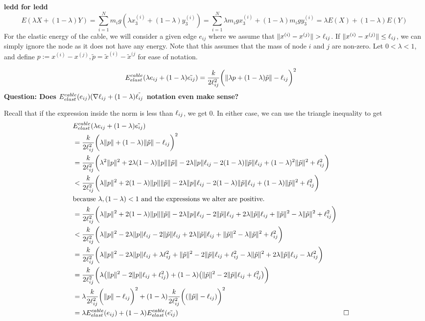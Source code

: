 \textbf{ledd for ledd}
\begin{equation*}
    E(\lambda X +(1-\lambda) Y) = \sum_{i=1}^N m_i g (\lambda x_3^{(i)} + (1-\lambda) y_3^{(i)})
    =\sum_{i=1}^N \lambda m_i g x_3^{(i)} + (1-\lambda) m_i g  y_3^{(i)} = \lambda E(X) + (1-\lambda) E(Y)
\end{equation*}
For the elastic energy of the cable, we will consider a given edge $e_{ij}$ where we assume that $\lVert x^{(i)} - x^{(j)}\rVert > \ell_{ij}$. If $\lVert x^{(i)} - x^{(j)}\rVert \leq \ell_{ij}$, we can simply ignore the node as it does not have any energy. Note that this assumes that the mass of node $i$ and $j$ are non-zero. Let $0 < \lambda < 1$, and define $p:=x^{(i)} - x^{(j)}, \tilde{p} = \tilde{x}^{(i)}-\tilde{x}^{(j}$ for ease of notation.


\begin{align*}
     E^{cable}_{elast}(\lambda e_{ij} + (1-\lambda) \tilde{e_{ij}}) &= \frac{k}{2 \ell_{ij}^2} \bigg( \lVert \lambda p + ( 1-\lambda ) \tilde{p} \rVert -\ell_{ij}\bigg)^2
\end{align*}
\textbf{Question: Does $E^{cable}_{elast}(e_{ij}) (\nabla \ell_{ij} + (1-\lambda) \tilde{\ell_{ij}}$ notation even make sense? }

Recall that if the expression inside the norm is less than $\ell_{ij}$, we get $0$. In either case, we can use the triangle inequality to get
\begin{align*}    
     &E^{cable}_{elast}(\lambda e_{ij} + (1-\lambda) \tilde{e_{ij}})\\ &=
      \frac{k}{2 \ell_{ij}^2} \bigg( \lambda \lVert p \rVert +( 1-\lambda ) \lVert \tilde{p} \rVert -\ell_{ij}\bigg)^2 \\ 
     &=\frac{k}{2 \ell_{ij}^2} \bigg( \lambda^2 \lVert p \rVert^2 + 2 \lambda (1-\lambda) \lVert p \rVert \lVert \tilde{p} \rVert -2 \lambda \lVert p \rVert \ell_{ij} -2(1-\lambda) \lVert \tilde{p} \rVert \ell_{ij} + (1-\lambda)^2 \lVert \tilde{p} \rVert^2 + \ell_{ij}^2 \bigg) \\
     &<\frac{k}{2 \ell_{ij}^2} \bigg( \lambda \lVert p \rVert^2 + 2 (1-\lambda) \lVert p \rVert \lVert \tilde{p} \rVert -2 \lambda \lVert p \rVert \ell_{ij} -2(1-\lambda) \lVert \tilde{p} \rVert \ell_{ij} + (1-\lambda) \lVert \tilde{p} \rVert^2 + \ell_{ij}^2 \bigg) \\ & \text{because }\lambda, (1-\lambda) < 1 \text{ and the expressions we alter are positive.} \\
     &= \frac{k}{2 \ell_{ij}^2} \bigg(\lambda \lVert p \rVert^2 + 2 (1-\lambda) \lVert p \rVert \lVert \tilde{p} \rVert - 2 \lambda \lVert p \rVert \ell_{ij} -2\lVert \tilde{p} \rVert \ell_{ij} +2 \lambda \lVert \tilde{p} \rVert \ell_{ij} + \lVert \tilde{p} \rVert^2 - \lambda \lVert \tilde{p} \rVert^2 + \ell_{ij}^2 \bigg) \\
     &< \frac{k}{2 \ell_{ij}^2} \bigg(\lambda \lVert p \rVert^2 - 2 \lambda \lVert p \rVert \ell_{ij} -2\lVert \tilde{p} \rVert \ell_{ij} +2 \lambda \lVert \tilde{p} \rVert \ell_{ij} + \lVert \tilde{p} \rVert^2 - \lambda \lVert \tilde{p} \rVert^2 + \ell_{ij}^2 \bigg)\\
     &= \frac{k}{2 \ell_{ij}^2} \bigg( \lambda \lVert p \rVert^2 - 2 \lambda \lVert p \rVert \ell_{ij} + \lambda \ell_{ij}^2 + \lVert \tilde{p} \rVert^2 - 2 \lVert \tilde{p} \rVert \ell_{ij} + \ell_{ij}^2 - \lambda \lVert \tilde{p} \rVert^2 + 2\lambda \lVert \tilde{p} \rVert \ell_{ij} - \lambda \ell_{ij}^2  \bigg)\\
     &= \frac{k}{2 \ell_{ij}^2} \bigg( \lambda \big(\lVert p \rVert^2 - 2 \lVert p \rVert \ell_{ij} + \ell_{ij}^2\big) + (1-\lambda) \big(\lVert \tilde{p} \rVert^2 -2 \lVert \tilde{p} \rVert \ell_{ij} + \ell_{ij}^2\big) \bigg)\\
     &= \lambda \frac{k}{2 \ell_{ij}^2}\bigg( \lVert p \rVert - \ell_{ij} \bigg)^2 + ( 1-\lambda )\frac{k}{2 \ell_{ij}^2}\bigg( ( \lVert \tilde{p} \rVert -\ell_{ij} ) \bigg)^2 
     \\&= \lambda E^{cable}_{elast}(e_{ij}) + (1-\lambda) E^{cable}_{elast}(\Tilde{e_{ij}})&&  \square
\end{align*}

